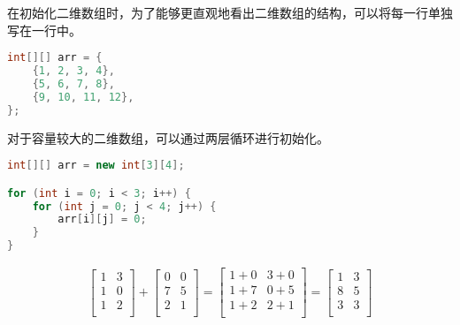 在初始化二维数组时，为了能够更直观地看出二维数组的结构，可以将每一行单独写在一行中。

\vspace{-0.5cm}

\begin{lstlisting}[language=Java]
int[][] arr = {
	{1, 2, 3, 4},
	{5, 6, 7, 8},
	{9, 10, 11, 12},
};
\end{lstlisting}

对于容量较大的二维数组，可以通过两层循环进行初始化。

\vspace{-0.5cm}

\begin{lstlisting}[language=Java]
int[][] arr = new int[3][4];

for (int i = 0; i < 3; i++) {
	for (int j = 0; j < 4; j++) {
		arr[i][j] = 0;
	}
}
\end{lstlisting}

\vspace{0.5cm}


\begin{align}\nonumber
	\left[\begin{matrix}
			1 & 3 \\
			1 & 0 \\
			1 & 2 \\
		\end{matrix} \right]
	+
	\left[\begin{matrix}
			0 & 0 \\
			7 & 5 \\
			2 & 1 \\
		\end{matrix} \right]
	=
	\left[\begin{matrix}
			1+0 & 3+0 \\
			1+7 & 0+5 \\
			1+2 & 2+1 \\
		\end{matrix} \right]
	=
	\left[\begin{matrix}
			1 & 3 \\
			8 & 5 \\
			3 & 3 \\
		\end{matrix} \right]
\end{align}

